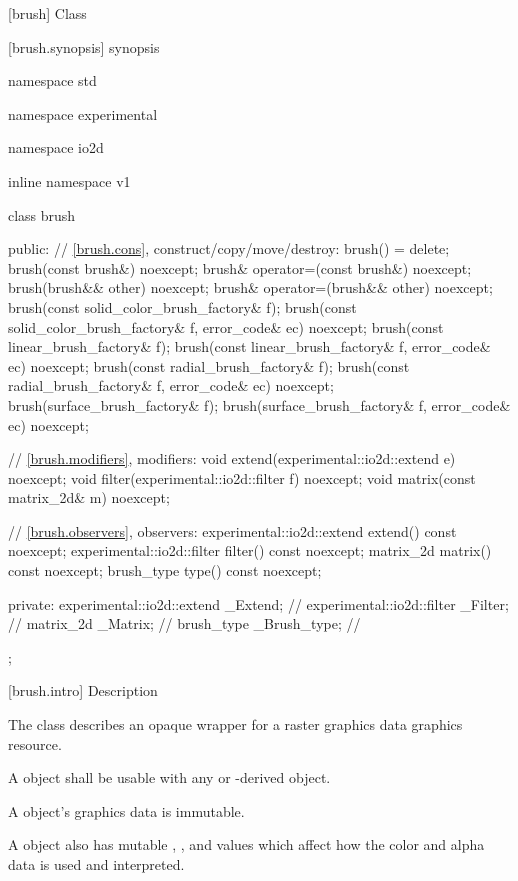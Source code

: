  [brush] {Class }

 [brush.synopsis] { synopsis}

\begin{codeblock}
namespace std { namespace experimental { namespace io2d { inline namespace v1 {
  class brush {
  public:
    // \ref{brush.cons}, construct/copy/move/destroy:
    brush() = delete;
    brush(const brush&) noexcept;
    brush& operator=(const brush&) noexcept;
    brush(brush&& other) noexcept;
    brush& operator=(brush&& other) noexcept;
    brush(const solid_color_brush_factory& f);
    brush(const solid_color_brush_factory& f, error_code& ec) noexcept;
    brush(const linear_brush_factory& f);
    brush(const linear_brush_factory& f, error_code& ec) noexcept;
    brush(const radial_brush_factory& f);
    brush(const radial_brush_factory& f, error_code& ec) noexcept;
    brush(surface_brush_factory& f);
    brush(surface_brush_factory& f, error_code& ec) noexcept;

    // \ref{brush.modifiers}, modifiers:
    void extend(experimental::io2d::extend e) noexcept;
    void filter(experimental::io2d::filter f) noexcept;
    void matrix(const matrix_2d& m) noexcept;

    // \ref{brush.observers}, observers:
    experimental::io2d::extend extend() const noexcept;
    experimental::io2d::filter filter() const noexcept;
    matrix_2d matrix() const noexcept;
    brush_type type() const noexcept;

  private:
    experimental::io2d::extend _Extend; // \expos
    experimental::io2d::filter _Filter; // \expos
    matrix_2d _Matrix;                         // \expos
    brush_type _Brush_type;                    // \expos
  };
} } } }
\end{codeblock}

 [brush.intro] { Description}

\pnum
{}
The class  describes an opaque wrapper for a raster graphics data graphics resource.

\pnum
A  object shall be usable with any  or -derived object.

\pnum
A  object's graphics data is immutable.

\pnum
A  object also has mutable , , and  values which affect how the color and alpha data is used and interpreted.

